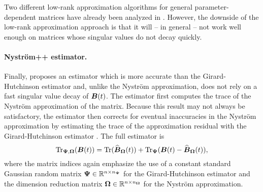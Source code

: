 Two different low-rank approximation algorithms for general parameter-dependent matrices have already been analyzed in \cite{kressner-2024-randomized-lowrank}. However, the downside of the low-rank approximation approach is that it will -- in general -- not work well enough on matrices whose singular values do not decay quickly.

%
%

\paragraph{Nyström++ estimator.} Finally, \cite{lin-2017-randomized-estimation} proposes an estimator which is more accurate than the Girard-Hutchinson estimator and, unlike the Nyström approximation, does not rely on a fast singular value decay of $\boldsymbol{B}(t)$. The estimator first computes the trace of the Nyström approximation  of the matrix. Because this result may not always be satisfactory, the estimator then corrects for eventual inaccuracies in the Nyström approximation by estimating the trace of the approximation residual with the Girard-Hutchinson estimator . The full estimator is
\begin{equation}
    \operatorname{Tr}_{\boldsymbol{\Psi}, \boldsymbol{\Omega}}(\boldsymbol{B}(t)) = \operatorname{Tr}(\widehat{\boldsymbol{B}}_{\boldsymbol{\Omega}}(t)) + \operatorname{Tr}_{\boldsymbol{\Psi}}(\boldsymbol{B}(t) - \widehat{\boldsymbol{B}}_{\boldsymbol{\Omega}}(t)),
    \label{equ:nystrompp-trace-estimator}
\end{equation}
where the matrix indices again emphasize the use of a constant standard Gaussian random matrix $\boldsymbol{\Psi} \in \mathbb{R}^{n \times n_{\boldsymbol{\Psi}}}$ for the Girard-Hutchinson estimator and the dimension reduction matrix $\boldsymbol{\Omega} \in \mathbb{R}^{n \times n_{\boldsymbol{\Omega}}}$ for the Nyström approximation.

